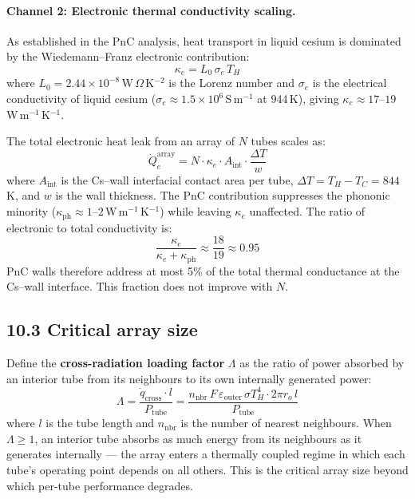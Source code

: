 \documentclass[12pt]{article}
\begin{document}
\paragraph{Channel 2: Electronic thermal conductivity scaling.}
As established in the PnC analysis, heat transport in liquid cesium is dominated
by the Wiedemann--Franz electronic contribution:
\begin{equation}
  \kappa_e = L_0\,\sigma_e\,T_H
  \label{eq:WF}
\end{equation}
where $L_0 = 2.44\times10^{-8}$\,W\,$\Omega$\,K$^{-2}$ is the Lorenz number
and $\sigma_e$ is the electrical conductivity of liquid cesium
($\sigma_e \approx 1.5\times10^6$\,S\,m$^{-1}$ at 944\,K), giving
$\kappa_e \approx 17$--$19$\,W\,m$^{-1}$\,K$^{-1}$.

The total electronic heat leak from an array of $N$ tubes scales as:
\begin{equation}
  \dot{Q}_e^{\mathrm{array}} = N \cdot \kappa_e \cdot A_{\mathrm{int}} \cdot
  \frac{\Delta T}{w}
  \label{eq:elec_scaling}
\end{equation}
where $A_{\mathrm{int}}$ is the Cs--wall interfacial contact area per tube,
$\Delta T = T_H - T_C = 844$\,K, and $w$ is the wall thickness. The PnC
contribution suppresses the phononic minority ($\kappa_{\mathrm{ph}} \approx
1$--$2$\,W\,m$^{-1}$\,K$^{-1}$) while leaving $\kappa_e$ unaffected. The
ratio of electronic to total conductivity is:
\begin{equation}
  \frac{\kappa_e}{\kappa_e + \kappa_{\mathrm{ph}}} \approx \frac{18}{19} \approx 0.95
\end{equation}
PnC walls therefore address at most 5\% of the total thermal conductance at
the Cs--wall interface. This fraction does not improve with $N$.

\subsection*{10.3 Critical array size}

Define the \textbf{cross-radiation loading factor} $\Lambda$ as the ratio of
power absorbed by an interior tube from its neighbours to its own internally
generated power:
\begin{equation}
  \Lambda = \frac{\dot{q}_{\mathrm{cross}} \cdot l}{P_{\mathrm{tube}}}
  = \frac{n_{\mathrm{nbr}}\,F\,\varepsilon_{\mathrm{outer}}\,\sigma T_H^4
          \cdot 2\pi r_o\,l}{P_{\mathrm{tube}}}
  \label{eq:Lambda}
\end{equation}
where $l$ is the tube length and $n_{\mathrm{nbr}}$ is the number of nearest
neighbours. When $\Lambda \geq 1$, an interior tube absorbs as much energy
from its neighbours as it generates internally — the array enters a
thermally coupled regime in which each tube's operating point depends on all
others. This is the critical array size beyond which per-tube performance
degrades.
\end{document}
